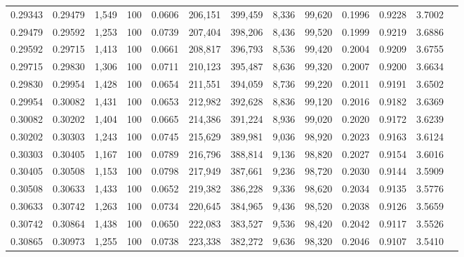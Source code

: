 \begin{tabular}{rrrrrrrrrrrrr}
0.29343 & 0.29479 & 1,549 & 100 &                                     0.0606 & 206,151 & 399,459 &   8,336 &  99,620 & 0.1996 & 0.9228 & 3.7002 \\
0.29479 & 0.29592 & 1,253 & 100 &                                     0.0739 & 207,404 & 398,206 &   8,436 &  99,520 & 0.1999 & 0.9219 & 3.6886 \\
0.29592 & 0.29715 & 1,413 & 100 &                                     0.0661 & 208,817 & 396,793 &   8,536 &  99,420 & 0.2004 & 0.9209 & 3.6755 \\
0.29715 & 0.29830 & 1,306 & 100 &                                     0.0711 & 210,123 & 395,487 &   8,636 &  99,320 & 0.2007 & 0.9200 & 3.6634 \\
0.29830 & 0.29954 & 1,428 & 100 &                                     0.0654 & 211,551 & 394,059 &   8,736 &  99,220 & 0.2011 & 0.9191 & 3.6502 \\
0.29954 & 0.30082 & 1,431 & 100 &                                     0.0653 & 212,982 & 392,628 &   8,836 &  99,120 & 0.2016 & 0.9182 & 3.6369 \\
0.30082 & 0.30202 & 1,404 & 100 &                                     0.0665 & 214,386 & 391,224 &   8,936 &  99,020 & 0.2020 & 0.9172 & 3.6239 \\
0.30202 & 0.30303 & 1,243 & 100 &                                     0.0745 & 215,629 & 389,981 &   9,036 &  98,920 & 0.2023 & 0.9163 & 3.6124 \\
0.30303 & 0.30405 & 1,167 & 100 &                                     0.0789 & 216,796 & 388,814 &   9,136 &  98,820 & 0.2027 & 0.9154 & 3.6016 \\
0.30405 & 0.30508 & 1,153 & 100 &                                     0.0798 & 217,949 & 387,661 &   9,236 &  98,720 & 0.2030 & 0.9144 & 3.5909 \\
0.30508 & 0.30633 & 1,433 & 100 &                                     0.0652 & 219,382 & 386,228 &   9,336 &  98,620 & 0.2034 & 0.9135 & 3.5776 \\
0.30633 & 0.30742 & 1,263 & 100 &                                     0.0734 & 220,645 & 384,965 &   9,436 &  98,520 & 0.2038 & 0.9126 & 3.5659 \\
0.30742 & 0.30864 & 1,438 & 100 &                                     0.0650 & 222,083 & 383,527 &   9,536 &  98,420 & 0.2042 & 0.9117 & 3.5526 \\
0.30865 & 0.30973 & 1,255 & 100 &                                     0.0738 & 223,338 & 382,272 &   9,636 &  98,320 & 0.2046 & 0.9107 & 3.5410 \\

\end{tabular}
